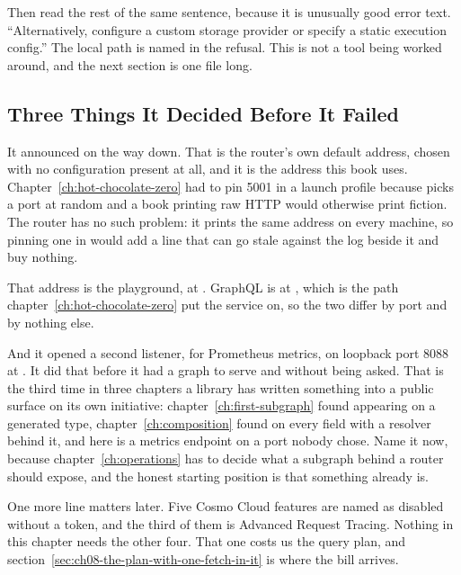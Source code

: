 %
Then read the rest of the same sentence, because it is unusually good error
text. \enquote{Alternatively, configure a custom storage provider or specify a
static execution config.} The local path is named in the refusal. This is not a
tool being worked around, and the next section is one file long.

\subsection{Three Things It Decided Before It Failed}

%
%
It announced  on the way down. That is the
router's own default address, chosen with no configuration present at all, and
it is the address this book uses. Chapter~\ref{ch:hot-chocolate-zero} had to pin
5001 in a launch profile because  picks a port at random
and a book printing raw HTTP would otherwise print fiction. The router has no
such problem: it prints the same address on every machine, so pinning one in
 would add a line that can go stale against the log beside it
and buy nothing.

%
That address is the playground, at \code{/}. GraphQL is at ,
which is the path chapter~\ref{ch:hot-chocolate-zero} put the service on, so
the two differ by port and by nothing else.

%
And it opened a second listener, for Prometheus metrics, on loopback port 8088
at . It did that before it had a graph to serve and without
being asked. That is the third time in three chapters a library has written
something into a public surface on its own initiative:
chapter~\ref{ch:first-subgraph} found  appearing on a generated
type, chapter~\ref{ch:composition} found  on every field with a
resolver behind it, and here is a metrics endpoint on a port nobody chose.
Name it now, because chapter~\ref{ch:operations} has to decide what a subgraph
behind a router should expose, and the honest starting position is that
something already is.

%
One more line matters later. Five Cosmo Cloud features are named as disabled
without a token, and the third of them is Advanced Request Tracing. Nothing in
this chapter needs the other four. That one costs us the query plan, and
section~\ref{sec:ch08-the-plan-with-one-fetch-in-it} is where the bill arrives.
%
